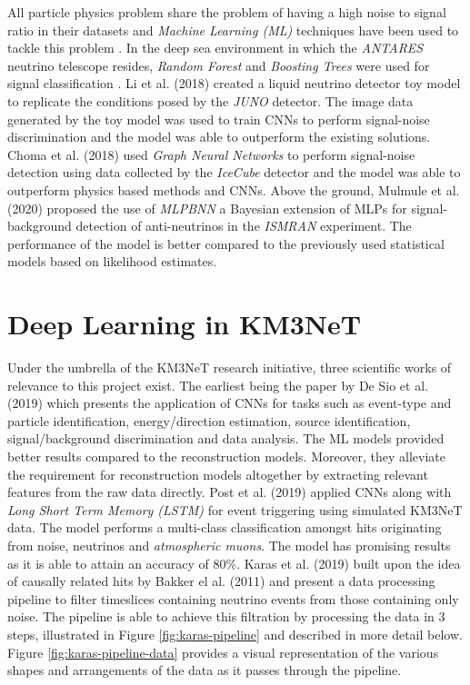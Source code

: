 All particle physics problem share the problem of having a high noise
to signal ratio in their datasets and \emph{Machine Learning (ML)}
techniques have been used to tackle this problem
\cite{mulmule2020machine, li2018deep, choma2018graph, neff2012signal}.
In the deep sea environment in which the \emph{ANTARES} neutrino
telescope resides, \emph{Random Forest} and \emph{Boosting Trees} were
used for signal classification \cite{neff2012signal}. Li et al. (2018)
created a liquid neutrino detector toy model to replicate the
conditions posed by the \emph{JUNO} detector. The image data generated
by the toy model was used to train CNNs to perform signal-noise
discrimination and the model was able to outperform the existing
solutions. Choma et al. (2018) used \emph{Graph Neural Networks} to
perform signal-noise detection using data collected by the
\emph{IceCube} detector and the model was able to outperform physics
based methods and CNNs. Above the ground, Mulmule et al. (2020)
proposed the use of \emph{MLPBNN} a Bayesian extension of MLPs for
signal-background detection of anti-neutrinos in the \emph{ISMRAN}
experiment. The performance of the model is better compared to the
previously used statistical models based on likelihood estimates.

\section{Deep Learning in KM3NeT}
\label{sec:dl-km3net}

Under the umbrella of the KM3NeT research initiative, three scientific
works of relevance to this project exist. The earliest being the paper
by De Sio et al. (2019) which presents the application of CNNs for
tasks such as event-type and particle identification, energy/direction
estimation, source identification, signal/background discrimination
and data analysis. The ML models provided better results compared to
the reconstruction models. Moreover, they alleviate the requirement
for reconstruction models altogether by extracting relevant features
from the raw data directly. Post et al. (2019) applied CNNs along with
\emph{Long Short Term Memory (LSTM)} \cite{sainath2015convolutional}
for event triggering using simulated KM3NeT data. The model performs a
multi-class classification amongst hits originating from noise,
neutrinos and \emph{atmospheric muons}. The model has promising
results as it is able to attain an accuracy of 80\%. Karas et al.
(2019) built upon the idea of causally related hits by Bakker el al.
(2011) and present a data processing pipeline to filter timeslices
containing neutrino events from those containing only noise. The
pipeline is able to achieve this filtration by processing the data in
3 steps, illustrated in Figure \ref{fig:karas-pipeline} and described
in more detail below. Figure \ref{fig:karas-pipeline-data} provides a
visual representation of the various shapes and arrangements of the
data as it passes through the pipeline.

